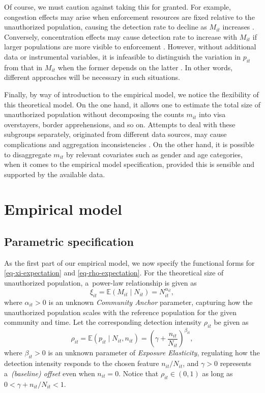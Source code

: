 Of course, we must caution against taking this for granted. For example, congestion effects may arise when enforcement resources are fixed relative to the unauthorized population, causing the detection rate to decline as $M_{it}$ increases \citep{fender1999general, hanson1999illegal}. Conversely, concentration effects may cause detection rate to increase with $M_{it}$ if larger populations are more visible to enforcement \citep{ethier1986illegal}. However, without additional data or instrumental variables, it is infeasible to distinguish the variation in $p_{it}$ from that in $M_{it}$ when the former depends on the latter \citep{link2003nonidentifiability}. In other words, different approaches will be necessary in such situations. 

Finally, by way of introduction to the empirical model, we notice the flexibility of this theoretical model. On the one hand, it allows one to estimate the total size of unauthorized population without decomposing the counts $m_{it}$ into visa overstayers, border apprehensions, and so on. Attempts to deal with these subgroups separately, originated from different data sources, may cause complications and aggregation inconsistencies \citep{warren1987count}. On the other hand, it is possible to disaggregate $m_{it}$ by relevant covariates such as gender and age categories, when it comes to the empirical model specification, provided this is sensible and supported by the available data. 



\section{Empirical model}\label{sec-empirical}

\subsection{Parametric specification}\label{parametric-specification}

As the first part of our empirical model, we now specify the functional forms for \eqref{eq-xi-expectation} and \eqref{eq-rho-expectation}. For the theoretical size of unauthorized population, a~power-law relationship is given as
\begin{equation}\label{eq-xi-form}
\xi_{it} = \mathbb{E}(M_{it} \mid N_{it}) = N_{it}^{\alpha_{it}},
\end{equation}
where $\alpha_{it} > 0$ is an unknown \emph{Community Anchor} parameter, capturing how the unauthorized population scales with the reference population for the given community and time. Let the corresponding detection intensity $\rho_{it}$ be given as
\begin{equation}\label{eq-rho-form}
\rho_{it} = \mathbb{E}(p_{it} \mid N_{it}, n_{it}) = \left( \gamma + \frac{n_{it}}{N_{it}}\right)^{\beta_{it}},
\end{equation}
where $\beta_{it} >0$ is an unknown parameter of \emph{Exposure Elasticity}, regulating how the detection intensity responds to the chosen feature $n_{it} / N_{it}$, and $\gamma > 0$ represents a~\emph{(baseline) offset} even when $n_{it} = 0$. Notice that $\rho_{it} \in (0,1)$ as long as $0< \gamma + n_{it} / N_{it} <1$.

